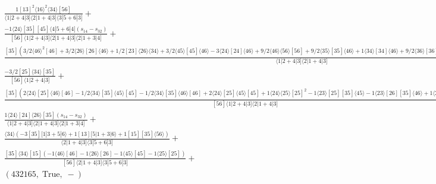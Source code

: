 \documentclass[varwidth, border=5pt]{standalone}
\begin{document}
\begin{my}
$\begin{gathered}
\scriptscriptstyle\frac{1[13]^2⟨16⟩^2⟨34⟩[56]}{⟨1|2+4|3]⟨2|1+4|3]⟨3|5+6|3]}+\\
\scriptscriptstyle\frac{-1⟨24⟩[35][45]⟨4|5+6|4](s_{14}-s_{32})}{[56]⟨1|2+4|3]⟨2|1+4|3]⟨2|1+3|4]}+\\
\scriptscriptstyle\frac{[35](3/2⟨46⟩^2[46]+3/2⟨26⟩[26]⟨46⟩+1/2[23]⟨26⟩⟨34⟩+3/2⟨45⟩[45]⟨46⟩-3⟨24⟩[24]⟨46⟩+9/2⟨46⟩⟨56⟩[56]+9/2⟨35⟩[35]⟨46⟩+1⟨34⟩[34]⟨46⟩+9/2⟨36⟩[36]⟨46⟩-1⟨34⟩[35]⟨56⟩+3/2⟨25⟩[25]⟨46⟩+3/2⟨24⟩[25]⟨56⟩)}{⟨1|2+4|3]⟨2|1+4|3]}+\\
\scriptscriptstyle\frac{-3/2[25]⟨34⟩[35]}{[56]⟨1|2+4|3]}+\\
\scriptscriptstyle\frac{[35](2⟨24⟩[25]⟨46⟩[46]-1/2⟨34⟩[35]⟨45⟩[45]-1/2⟨34⟩[35]⟨46⟩[46]+2⟨24⟩[25]⟨45⟩[45]+1⟨24⟩⟨25⟩[25]^2-1⟨23⟩[25][35]⟨45⟩-1⟨23⟩[26][35]⟨46⟩+1⟨24⟩[25]⟨26⟩[26])}{[56]⟨1|2+4|3]⟨2|1+4|3]}+\\
\scriptscriptstyle\frac{1⟨24⟩[24]⟨26⟩[35](s_{14}-s_{32})}{⟨1|2+4|3]⟨2|1+4|3]⟨2|1+3|4]}+\\
\scriptscriptstyle\frac{⟨34⟩(-3[35][1|3+5|6⟩+1[13][5|1+3|6⟩+1[15][35]⟨56⟩)}{⟨2|1+4|3]⟨3|5+6|3]}+\\
\scriptscriptstyle\frac{[35]⟨34⟩[15](-1⟨46⟩[46]-1⟨26⟩[26]-1⟨45⟩[45]-1⟨25⟩[25])}{[56]⟨2|1+4|3]⟨3|5+6|3]}+\\
\scriptscriptstyle(432165,\;\text{True},\;-)\phantom{+}
\end{gathered}$
\end{my}
\end{document}
